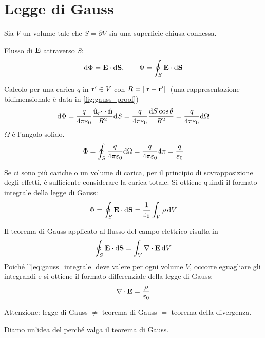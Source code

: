 \section{Legge di Gauss}

Sia $V$ un volume tale che $S = \partial V$ sia una superficie chiusa connessa.

Flusso di $\mathbf{E}$ attraverso $S$:
\begin{equation}
    \mathrm{d} \Phi = \mathbf{E} \cdot \mathrm{d} \mathbf{S}, \qquad \Phi = \oint_S \mathbf{E} \cdot \mathrm{d} \mathbf{S}
\end{equation}


Calcolo per una carica $q$ in $\mathbf{r}' \in V$ con $R = \left\lVert \mathbf{r} - \mathbf{r}' \right\rVert$
(una rappresentazione bidimensionale è data in \cref{fig:gauss_proof})
\begin{equation}
    \mathrm{d} \Phi = \frac{q}{4\pi \varepsilon_0} \frac{\hat{\mathbf{u}}_{r'} \cdot \hat{\mathbf{n}}}{R^2} \mathrm{d} S = \frac{q}{4\pi \varepsilon_0} \frac{\mathrm{d} S \cos \theta}{R^2} = \frac{q}{4\pi \varepsilon_0} \mathrm{d} \Omega
\end{equation}
$\Omega$ è l'angolo solido.
\begin{equation}
    \Phi = \oint_S \frac{q}{4\pi \varepsilon_0} \mathrm{d} \Omega
    = \frac{q}{4\pi \varepsilon_0} 4\pi
    = \frac{q}{\varepsilon_0}
\end{equation}

Se ci sono più cariche o un volume di carica, per il principio di sovrapposizione degli effetti, è sufficiente considerare la carica totale.
Si ottiene quindi il formato integrale della legge di Gauss:
\begin{equation}
\label{eq:gauss_integrale}
    \Phi = \oint_S \mathbf{E} \cdot \mathrm{d} \mathbf{S} = \frac{1}{\varepsilon_0} \int_V \rho \, \mathrm{d} V
\end{equation}

Il teorema di Gauss applicato al flusso del campo elettrico risulta in
\begin{equation}
    \oint_S \mathbf{E} \cdot \mathrm{d} \mathbf{S} = \int_V \nabla \cdot \mathbf{E} \, \mathrm{d} V
\end{equation}
Poiché l'\cref{eq:gauss_integrale} deve valere per ogni volume $V$, occorre eguagliare gli integrandi e si ottiene il formato differenziale della legge di Gauss:
\begin{equation}
    \nabla \cdot \mathbf{E} = \frac{\rho}{\varepsilon_0}
\end{equation}

Attenzione: legge di Gauss $\ne$ teorema di Gauss $=$ teorema della divergenza.

Diamo un'idea del perché valga il teorema di Gauss.

